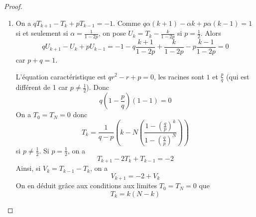 \documentclass[12pt]{article}
\begin{document}
\begin{proof}
\begin{enumerate}
        \item On a $qT_{k+1}-T_{k}+pT_{k-1}=-1$. Comme $q\alpha(k+1)-\alpha k+p\alpha(k-1)=1$ si et seulement si $\alpha=\frac{1}{1-2p}$, on pose $U_{k}=T_{k}-\frac{k}{1-2p}$ si $p=\frac{1}{2}$. Alors 
        \begin{equation}
            qU_{k+1}-U_{k}+pU_{k-1}=-1-q\frac{k+1}{1-2p}+\frac{k}{1-2p}-p\frac{k-1}{1-2p}=0
        \end{equation}
        car $p+q=1$.

        L'équation caractéristique est $qr^{2}-r+p=0$, les racines sont $1$ et $\frac{p}{q}$ (qui est différent de 1 car $p\neq \frac{1}{2}$). Donc 
        \begin{equation}
            q\left(1-\frac{p}{q}\right)(1-1)=0
        \end{equation}
        On a $T_{0}=T_{N}=0$ donc 
        \begin{equation}
            \boxed{T_{k}=\frac{1}{q-p}\left(k-N\left(\frac{1-\left(\frac{q}{p}\right)^{k}}{1-\left(\frac{q}{p}\right)^{N}}\right)\right)}
        \end{equation}
        si $p\neq\frac{1}{2}$. Si $p=\frac{1}{2}$, on a 
        \begin{equation}
            T_{k+1}-2T_{k}+T_{k-1}=-2    
        \end{equation}
        Ainsi, si $V_{k}=T_{k-1}-T_{k}$, on a 
        \begin{equation}
            V_{k+1}=-2+V_{k}
        \end{equation}
        On en déduit grâce aux conditions aux limites $T_{0}=T_{N}=0$ que 
        \begin{equation}
            \boxed{T_{k}=k(N-k)}
        \end{equation}
    \end{enumerate}
\end{proof}
\end{document}
